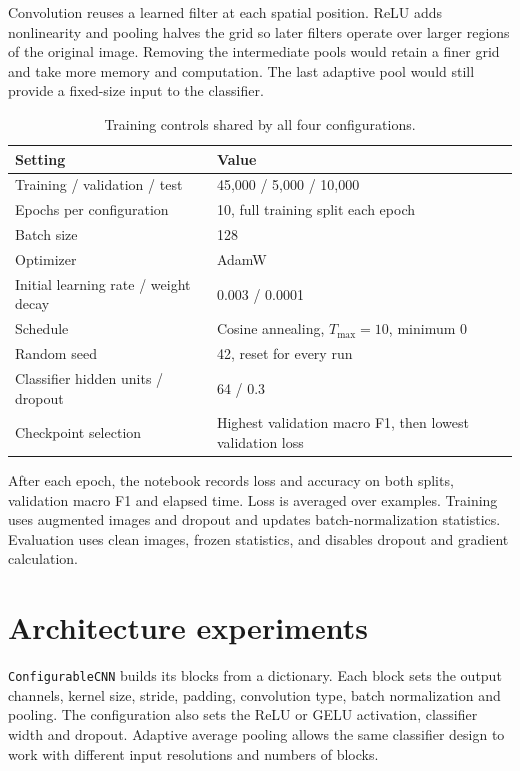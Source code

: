 \documentclass[11pt,a4paper]{article}
\begin{document}
Convolution reuses a learned filter at each spatial position. ReLU adds
nonlinearity and pooling halves the grid so later filters operate over
larger regions of the original image. Removing the intermediate pools
would retain a finer grid and take more memory and computation. The last
adaptive pool would still provide a fixed-size input to the classifier.

\begin{table}[htbp]\centering
\caption{Training controls shared by all four configurations.}
\begin{tabular}{@{}ll@{}}\toprule
Setting & Value\\\midrule
Training / validation / test & 45,000 / 5,000 / 10,000\\
Epochs per configuration & 10, full training split each epoch\\
Batch size & 128\\
Optimizer & AdamW\\
Initial learning rate / weight decay & 0.003 / 0.0001\\
Schedule & Cosine annealing, $T_{\max}=10$, minimum 0\\
Random seed & 42, reset for every run\\
Classifier hidden units / dropout & 64 / 0.3\\
Checkpoint selection & Highest validation macro F1, then lowest validation loss\\
\bottomrule\end{tabular}
\end{table}

After each epoch, the notebook records loss and accuracy on both splits,
validation macro F1 and elapsed time. Loss is averaged over examples.
Training uses augmented images and dropout and updates batch-normalization
statistics. Evaluation uses clean images, frozen statistics, and disables
dropout and gradient calculation.

\section{Architecture experiments}
\texttt{ConfigurableCNN} builds its blocks from a dictionary. Each block
sets the output channels, kernel size, stride, padding, convolution type,
batch normalization and pooling. The configuration also sets the ReLU or
GELU activation, classifier width and dropout. Adaptive average pooling
allows the same classifier design to work with different input resolutions
and numbers of blocks.
\end{document}

